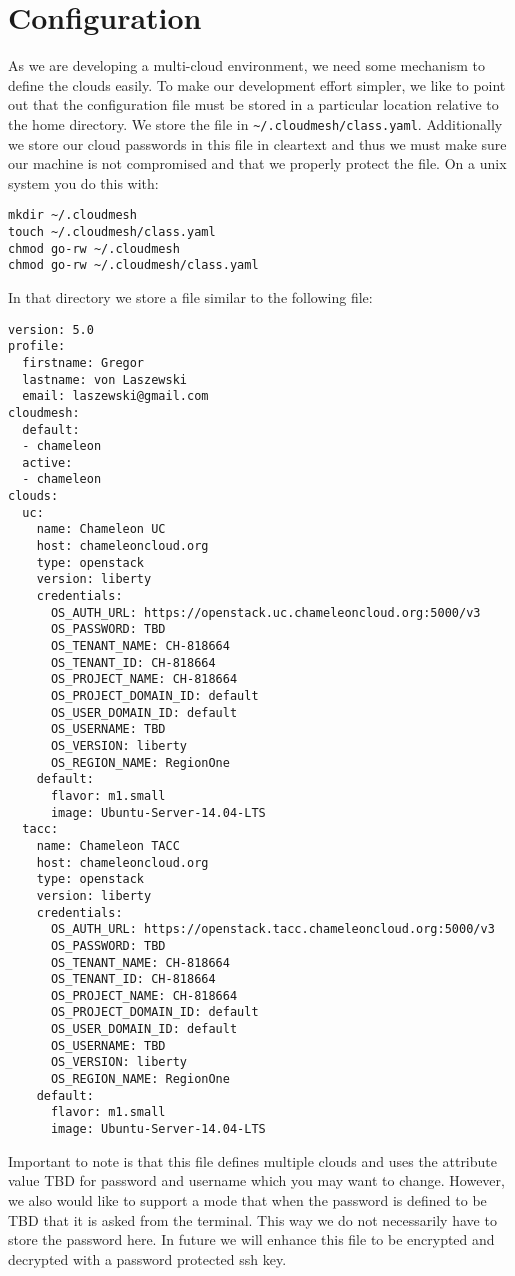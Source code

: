 \section{Configuration}

As we are developing a multi-cloud environment, we need some mechanism
to define the clouds easily. To make our development effort simpler,
we like to point out that the configuration file must be stored in a
particular location relative to the home directory. We store the file
in \verb|~/.cloudmesh/class.yaml|. Additionally we store our cloud
passwords in this file in cleartext and thus we must make sure our
machine is not compromised and that we properly protect the file. On a
unix system you do this with:

\begin{verbatim}
mkdir ~/.cloudmesh
touch ~/.cloudmesh/class.yaml
chmod go-rw ~/.cloudmesh
chmod go-rw ~/.cloudmesh/class.yaml
\end{verbatim}

In that directory we store a file similar to the following file:

\begin{verbatim}
version: 5.0
profile:
  firstname: Gregor
  lastname: von Laszewski
  email: laszewski@gmail.com
cloudmesh:
  default:
  - chameleon 
  active:
  - chameleon
clouds:
  uc:
    name: Chameleon UC
    host: chameleoncloud.org
    type: openstack
    version: liberty
    credentials:
      OS_AUTH_URL: https://openstack.uc.chameleoncloud.org:5000/v3
      OS_PASSWORD: TBD
      OS_TENANT_NAME: CH-818664
      OS_TENANT_ID: CH-818664
      OS_PROJECT_NAME: CH-818664
      OS_PROJECT_DOMAIN_ID: default
      OS_USER_DOMAIN_ID: default
      OS_USERNAME: TBD
      OS_VERSION: liberty
      OS_REGION_NAME: RegionOne
    default:
      flavor: m1.small
      image: Ubuntu-Server-14.04-LTS
  tacc:
    name: Chameleon TACC
    host: chameleoncloud.org
    type: openstack
    version: liberty
    credentials:
      OS_AUTH_URL: https://openstack.tacc.chameleoncloud.org:5000/v3
      OS_PASSWORD: TBD
      OS_TENANT_NAME: CH-818664
      OS_TENANT_ID: CH-818664
      OS_PROJECT_NAME: CH-818664
      OS_PROJECT_DOMAIN_ID: default
      OS_USER_DOMAIN_ID: default
      OS_USERNAME: TBD
      OS_VERSION: liberty
      OS_REGION_NAME: RegionOne
    default:
      flavor: m1.small
      image: Ubuntu-Server-14.04-LTS
\end{verbatim}

Important to note is that this file defines multiple clouds and uses
the attribute value TBD for password and username which you may want
to change. However, we also would like to support a mode that when the
password is defined to be TBD that it is asked from the terminal. This
way we do not necessarily have to store the password here. In future
we will enhance this file to be encrypted and decrypted with a
password protected ssh key.

